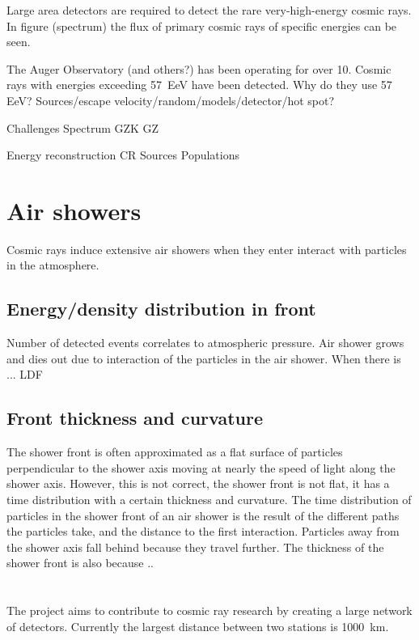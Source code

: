 Large area detectors are required to detect the rare very-high-energy
cosmic rays. In figure (spectrum) the flux of primary cosmic rays of
specific energies can be seen. 

The Auger Observatory (and others?) has been operating for over
\SI{10}{\year}. Cosmic rays with energies exceeding
\SI{57}{\exa\electronvolt} have been detected. Why do they use 57 EeV?
Sources/escape velocity/random/models/detector/hot spot?

Challenges
Spectrum
GZK
GZ

Energy reconstruction
CR Sources
Populations


\section{Air showers}

Cosmic rays induce extensive air showers when they enter interact with particles in the atmosphere.


\subsection{Energy/density distribution in front}

Number of detected events correlates to atmospheric pressure.
Air shower grows and dies out due to interaction of the particles in the air shower. When there is 
... LDF


\subsection{Front thickness and curvature}

The shower front is often approximated as a flat surface  of particles
perpendicular to the shower axis moving at nearly the speed of light
along the shower axis. However, this is not correct, the shower front is
not flat, it has a time distribution with a certain thickness and
curvature. The time distribution of particles in the shower front of an
air shower is the result of the different paths the particles take, and
the distance to the first interaction. Particles away from the shower
axis fall behind because they travel further. The thickness of the
shower front is also because ..


\section{\hisparc}

The \hisparc project aims to contribute to cosmic ray research by
creating a large network of detectors. Currently the largest distance
between two stations is \SI{1000}{\kilo\meter}.

